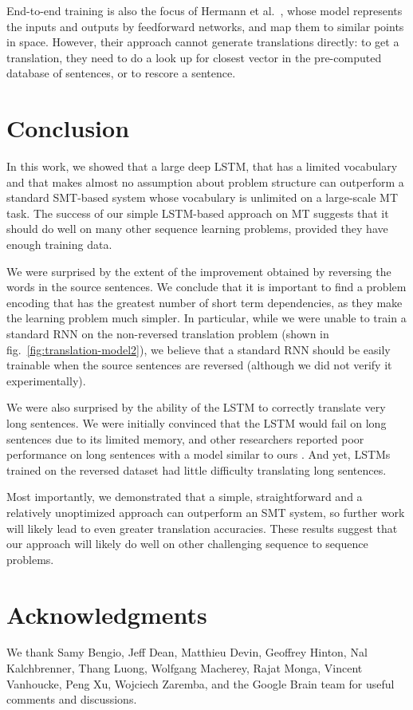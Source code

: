 \documentclass{article} \usepackage{nips14submit_e}
\begin{document}
End-to-end training is also the focus of Hermann et
al.~\cite{hermann14}, whose model represents the inputs and outputs by
feedforward networks, and map them to similar points in
space. However, their approach cannot generate translations directly:
to get a translation, they need to do a look up for closest vector in
the pre-computed database of sentences, or to rescore a sentence.
 
\section{Conclusion}

In this work, we showed that a large deep LSTM, that has a limited 
vocabulary and that makes almost no
assumption about problem structure can outperform a standard SMT-based system whose vocabulary
is unlimited on a large-scale MT task.  The success of our simple
LSTM-based approach on MT suggests that it should do well on many
other sequence learning problems, provided they have enough training
data.

We were surprised by the extent of the improvement obtained by
reversing the words in the source sentences.  We conclude that it is
important to find a problem encoding that has the greatest number of
short term dependencies, as they make the learning problem much
simpler.  In particular, while we were unable to train a standard
RNN on the non-reversed translation problem (shown in
fig.~\ref{fig:translation-model2}), we believe that a standard RNN
should be easily trainable when the source sentences are reversed (although we
did not verify it experimentally).

We were also surprised by the ability of the LSTM to correctly
translate very long sentences.  We were initially convinced that the
LSTM would fail on long sentences due to its limited memory, and other
researchers reported poor performance on long sentences with a model
similar to ours \cite{cho14,bog14,curse}.  And yet,
LSTMs trained on the reversed dataset had little difficulty translating long
sentences.

Most importantly, we demonstrated that a simple, straightforward and a
relatively unoptimized approach can outperform an SMT system, so
further work will likely lead to even greater translation accuracies.  
These results suggest that our approach will likely   
do well on other challenging sequence to sequence problems.
 


\small
\section{Acknowledgments}

We thank Samy Bengio, Jeff Dean, Matthieu Devin, Geoffrey Hinton, Nal Kalchbrenner, Thang Luong, Wolfgang
Macherey, Rajat Monga, Vincent Vanhoucke, Peng Xu, Wojciech Zaremba,
and the Google Brain team for useful comments and discussions.


 

\end{document}
